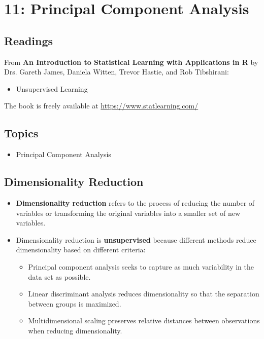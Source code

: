 \documentclass[
  letterpaper,
  DIV=11,
  numbers=noendperiod]{scrreprt}
\providecommand{\tightlist}{%
  \setlength{\itemsep}{0pt}\setlength{\parskip}{0pt}}\usepackage{longtable,booktabs,array}
\begin{document}
\chapter{11: Principal Component
Analysis}\label{principal-component-analysis}

\section{Readings}\label{readings-12}

From \textbf{An Introduction to Statistical Learning with Applications
in R} by Drs. Gareth James, Daniela Witten, Trevor Hastie, and Rob
Tibshirani:

\begin{itemize}
\tightlist
\item
  Unsupervised Learning
\end{itemize}

The book is freely available at \url{https://www.statlearning.com/}

\section{Topics}\label{topics-14}

\begin{itemize}
\tightlist
\item
  Principal Component Analysis
\end{itemize}

\section{Dimensionality Reduction}\label{dimensionality-reduction}

\begin{itemize}
\item
  \textbf{Dimensionality reduction} refers to the process of reducing
  the number of variables or transforming the original variables into a
  smaller set of new variables.
\item
  Dimensionality reduction is \textbf{unsupervised} because different
  methods reduce dimensionality based on different criteria:

  \begin{itemize}
  \item
    Principal component analysis seeks to capture as much variability in
    the data set as possible.
  \item
    Linear discriminant analysis reduces dimensionality so that the
    separation between groups is maximized.
  \item
    Multidimensional scaling preserves relative distances between
    observations when reducing dimensionality.
  \end{itemize}
\end{itemize}
\end{document}
